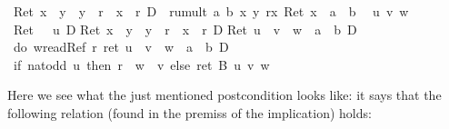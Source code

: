 \begin{isabellebody}
\begin{isamarkuptxt}
      \begin{isabelle}%
{\isasymturnstile}\ Ret\ {\isacharparenleft}x\ {\isasymnoteq}\ y\ {\isasymand}\ y\ {\isasymnoteq}\ r\ {\isasymand}\ x\ {\isasymnoteq}\ r{\isacharparenright}\ {\isasymlongrightarrow}\isactrlsub D\ {\isacharbrackleft}{\isacharhash}\ rumult\ a\ b\ x\ y\ r{\isacharbrackright}{\isacharparenleft}{\isasymlambda}x{\isachardot}\ Ret\ {\isacharparenleft}x\ {\isacharequal}\ a\ {\isacharasterisk}\ b{\isacharparenright}{\isacharparenright}\isanewline
\ {}{\isachardot}\ {\isasymAnd}u\ v\ w{\isachardot}\isanewline
{}\ Ret\ {\isacharparenleft}{}\ {\isacharless}\ u{\isacharparenright}\ {\isasymand}\isactrlsub D\isanewline
{}Ret\ {\isacharparenleft}x\ {\isasymnoteq}\ y\ {\isasymand}\ y\ {\isasymnoteq}\ r\ {\isasymand}\ x\ {\isasymnoteq}\ r{\isacharparenright}\ {\isasymand}\isactrlsub D\isanewline
{}Ret\ {\isacharparenleft}u\ {\isacharasterisk}\ v\ {\isacharplus}\ w\ {\isacharequal}\ a\ {\isacharasterisk}\ b{\isacharparenright}\ {\isasymand}\isactrlsub D\isanewline
{}\ {\isacharparenleft}do\ {\isacharbraceleft}w{\isasymleftarrow}readRef\ r{\isacharsemicolon}\ ret\ {\isacharparenleft}u\ {\isacharasterisk}\ v\ {\isacharplus}\ w\ {\isacharequal}\ a\ {\isacharasterisk}\ b{\isacharparenright}{\isacharbraceright}{\isacharparenright}\ {\isasymlongrightarrow}\isactrlsub D\isanewline
{}\ if\ nat{\isacharunderscore}odd\ u\ then\ r\ {\isacharcolon}{\isacharequal}\ w\ {\isacharplus}\ v\ else\ ret\ {\isacharparenleft}{\isacharparenright}{\isacharbrackright}{\isacharquery}B{}{}{}\ u\ v\ w%
\end{isabelle}%
\end{isamarkuptxt}%
\isamarkuptrue%
\isamarkupfalse%
\isamarkupfalse%
\isamarkupfalse%
\isamarkupfalse%
\isamarkupfalse%
\isamarkupfalse%
\isamarkupfalse%
\isamarkupfalse%
\isamarkupfalse%
\isamarkupfalse%
\isamarkupfalse%
\isamarkupfalse%
\isamarkupfalse%
\isamarkupfalse%
\isamarkupfalse%
\isamarkupfalse%
\isamarkupfalse%
\isamarkupfalse%
\isamarkupfalse%
\isamarkupfalse%
\isamarkupfalse%
\isamarkupfalse%
%
\begin{isamarkuptxt}%
Here we see what the just mentioned postcondition looks like: it says that the following
      relation (found in the premiss of the implication) holds:
      

\end{isamarkuptxt}
\end{isabellebody}
